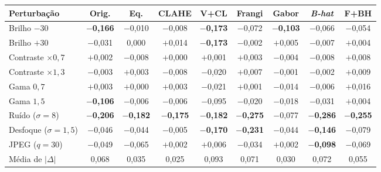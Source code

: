 \begin{tabular}{lcccccccc}
\toprule
Perturbação & Orig. & Eq. & CLAHE & V+CL & Frangi & Gabor & \textit{B-hat} & F+BH \\
\midrule
Brilho $-30$ & \textbf{$-$0,166} & $-$0,010 & $-$0,008 & \textbf{$-$0,173} & $-$0,072 & \textbf{$-$0,103} & $-$0,066 & $-$0,054 \\
Brilho $+30$ & $-$0,031 & 0,000 & $+$0,014 & \textbf{$-$0,173} & $-$0,002 & $+$0,005 & $-$0,007 & $+$0,004 \\
Contraste $\times0{,}7$ & $+$0,002 & $-$0,008 & $+$0,000 & $+$0,001 & $+$0,003 & $-$0,004 & $-$0,008 & $+$0,008 \\
Contraste $\times1{,}3$ & $-$0,003 & $+$0,003 & $-$0,008 & $-$0,020 & $+$0,007 & $-$0,001 & $-$0,002 & $+$0,009 \\
Gama $0{,}7$ & $+$0,003 & $+$0,000 & $+$0,003 & $-$0,021 & $+$0,001 & $-$0,014 & $-$0,006 & $+$0,016 \\
Gama $1{,}5$ & \textbf{$-$0,106} & $-$0,006 & $-$0,006 & $-$0,095 & $-$0,020 & $-$0,018 & $-$0,031 & $+$0,004 \\
Ruído ($\sigma=8$) & \textbf{$-$0,206} & \textbf{$-$0,182} & \textbf{$-$0,175} & \textbf{$-$0,182} & \textbf{$-$0,275} & $-$0,077 & \textbf{$-$0,286} & \textbf{$-$0,255} \\
Desfoque ($\sigma=1{,}5$) & $-$0,046 & $-$0,044 & $-$0,005 & \textbf{$-$0,170} & \textbf{$-$0,231} & $-$0,044 & \textbf{$-$0,146} & $-$0,079 \\
JPEG ($q=30$) & $-$0,049 & $-$0,065 & $+$0,002 & $+$0,006 & $-$0,034 & $+$0,002 & \textbf{$-$0,098} & $-$0,069 \\
\midrule
Média de $|\Delta|$ & 0,068 & 0,035 & 0,025 & 0,093 & 0,071 & 0,030 & 0,072 & 0,055 \\
\bottomrule
\end{tabular}
